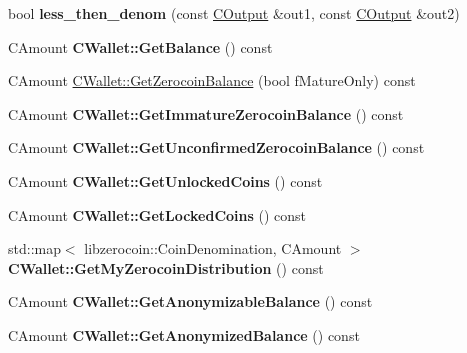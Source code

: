 \begin{DoxyCompactItemize}
\item 
\mbox{\label{group___actions_ga502a73c6cf145be4a420a8bc75c6a69e}} 
bool {\bfseries less\+\_\+then\+\_\+denom} (const \mbox{\hyperlink{class_c_output}{C\+Output}} \&out1, const \mbox{\hyperlink{class_c_output}{C\+Output}} \&out2)
\item 
\mbox{\label{group___actions_gaa6522c2833bc0a84d216cf102b51ba05}} 
C\+Amount {\bfseries C\+Wallet\+::\+Get\+Balance} () const
\item 
C\+Amount \mbox{\hyperlink{group___actions_gaba22138d6c6eabe35feed7570a78ee7d}{C\+Wallet\+::\+Get\+Zerocoin\+Balance}} (bool f\+Mature\+Only) const
\item 
\mbox{\label{group___actions_gaae3dc5685679930143e0ea16cb560ea7}} 
C\+Amount {\bfseries C\+Wallet\+::\+Get\+Immature\+Zerocoin\+Balance} () const
\item 
\mbox{\label{group___actions_ga3f3fbeab349ab9f1a9bc45f1f7aea691}} 
C\+Amount {\bfseries C\+Wallet\+::\+Get\+Unconfirmed\+Zerocoin\+Balance} () const
\item 
\mbox{\label{group___actions_gac53ff383877722c629056bbefa74e846}} 
C\+Amount {\bfseries C\+Wallet\+::\+Get\+Unlocked\+Coins} () const
\item 
\mbox{\label{group___actions_ga6e44b124ff5bb788fc9f54bb9a557a87}} 
C\+Amount {\bfseries C\+Wallet\+::\+Get\+Locked\+Coins} () const
\item 
\mbox{\label{group___actions_ga003692a074c0d4193456d453e739c2b2}} 
std\+::map$<$ libzerocoin\+::\+Coin\+Denomination, C\+Amount $>$ {\bfseries C\+Wallet\+::\+Get\+My\+Zerocoin\+Distribution} () const
\item 
\mbox{\label{group___actions_ga173ba5fb0dee2879755682ec21ee57a7}} 
C\+Amount {\bfseries C\+Wallet\+::\+Get\+Anonymizable\+Balance} () const
\item 
\mbox{\label{group___actions_gad71e805ab9614962a57cb931e91b4297}} 
C\+Amount {\bfseries C\+Wallet\+::\+Get\+Anonymized\+Balance} () const

\end{DoxyCompactItemize}
